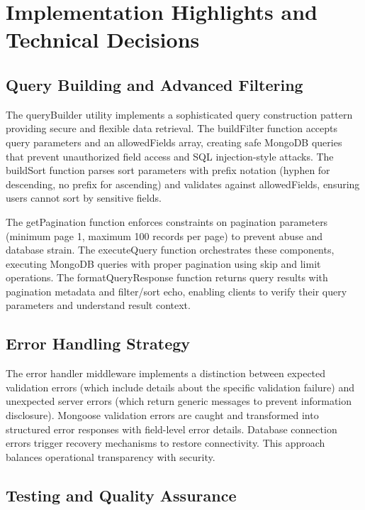 \documentclass[12pt,a4paper]{article}
\begin{document}
\section{Implementation Highlights and Technical Decisions}

\subsection{Query Building and Advanced Filtering}

The queryBuilder utility implements a sophisticated query construction pattern providing secure and flexible data retrieval. The buildFilter function accepts query parameters and an allowedFields array, creating safe MongoDB queries that prevent unauthorized field access and SQL injection-style attacks. The buildSort function parses sort parameters with prefix notation (hyphen for descending, no prefix for ascending) and validates against allowedFields, ensuring users cannot sort by sensitive fields.

The getPagination function enforces constraints on pagination parameters (minimum page 1, maximum 100 records per page) to prevent abuse and database strain. The executeQuery function orchestrates these components, executing MongoDB queries with proper pagination using skip and limit operations. The formatQueryResponse function returns query results with pagination metadata and filter/sort echo, enabling clients to verify their query parameters and understand result context.

\subsection{Error Handling Strategy}

The error handler middleware implements a distinction between expected validation errors (which include details about the specific validation failure) and unexpected server errors (which return generic messages to prevent information disclosure). Mongoose validation errors are caught and transformed into structured error responses with field-level error details. Database connection errors trigger recovery mechanisms to restore connectivity. This approach balances operational transparency with security.

\subsection{Testing and Quality Assurance}
\end{document}
